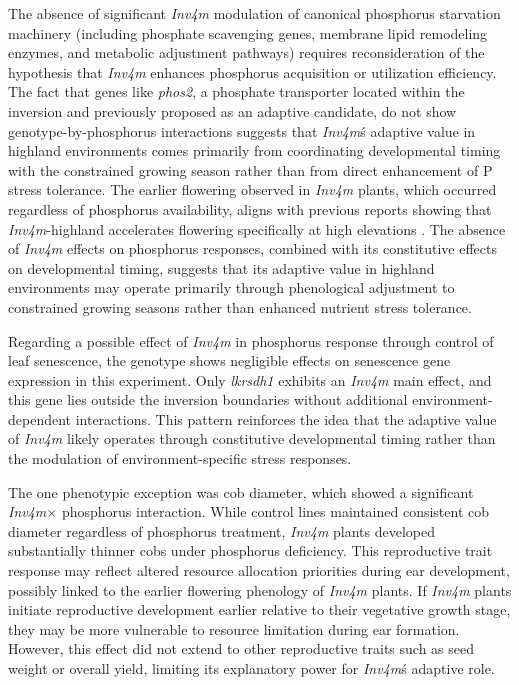 \documentclass[9pt,twocolumn,twoside]{rilabRxiv}
\newcommand{\invfour}{\textit{Inv4m}\xspace}
\begin{document}
The absence of significant \invfour modulation of canonical phosphorus starvation machinery (including phosphate scavenging genes, membrane lipid remodeling enzymes, and metabolic adjustment pathways) requires reconsideration of the hypothesis that \invfour enhances phosphorus acquisition or utilization efficiency.
The fact that genes like \textit{phos2}, a phosphate transporter located within the inversion and previously proposed as an adaptive candidate, do not show genotype-by-phosphorus interactions suggests that \invfour\'s adaptive value in highland environments comes primarily from coordinating developmental timing with the constrained growing season rather than from direct enhancement of P stress tolerance.
The earlier flowering observed in \invfour plants, which occurred regardless of phosphorus availability, aligns with previous reports showing that \invfour-highland accelerates flowering specifically at high elevations \cite{gates2019,barnes2022}.
The absence of \invfour effects on phosphorus responses, combined with its constitutive effects on developmental timing, suggests that its adaptive value in highland environments may operate primarily through phenological adjustment to constrained growing seasons rather than enhanced nutrient stress tolerance.

Regarding a possible effect of \invfour in phosphorus response through control of leaf senescence, the genotype shows negligible effects on senescence gene expression in this experiment. 
Only \textit{lkrsdh1} exhibits an \invfour main effect, and this gene lies outside the inversion boundaries without additional environment-dependent interactions. 
This pattern reinforces the idea that the adaptive value of \invfour likely operates through constitutive developmental timing rather than the modulation of environment-specific stress responses.

The one phenotypic exception was cob diameter, which showed a significant \invfour $\times$ phosphorus interaction.
While control lines maintained consistent cob diameter regardless of phosphorus treatment, \invfour plants developed substantially thinner cobs under phosphorus deficiency.
This reproductive trait response may reflect altered resource allocation priorities during ear development, possibly linked to the earlier flowering phenology of \invfour plants.
If \invfour plants initiate reproductive development earlier relative to their vegetative growth stage, they may be more vulnerable to resource limitation during ear formation.
However, this effect did not extend to other reproductive traits such as seed weight or overall yield, limiting its explanatory power for \invfour\'s adaptive role.
\end{document}
